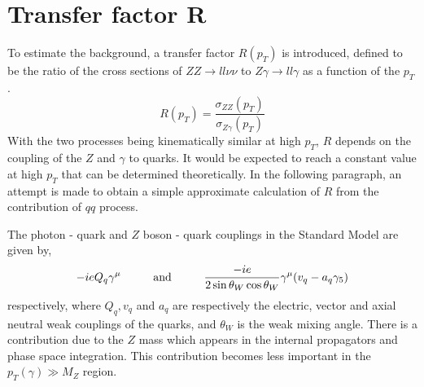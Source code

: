 \documentclass[11pt,a4paper,openright,twoside]{report}
\newcommand{\ZZ}{$ZZ\to ll\nu\nu$ }
\newcommand{\Zg}{$Z\gamma\to ll\gamma$ }
\begin{document}
\section{Transfer factor R}
To estimate the background, a transfer factor $R(p_T)$ is introduced, defined to be the ratio of the cross sections of \ZZ to \Zg as a function of the $p_T$.
\begin{equation}
	R(p_{T}) = \frac{\sigma_{ZZ}(p_{T})}{\sigma_{Z\gamma}(p_T)}
\end{equation}
With the two processes being kinematically similar at high $p_T$, $R$ depends on the coupling of the $Z$ and $\gamma$ to quarks. It would be expected to reach a constant value at high $p_T$ that can be determined theoretically. In the following paragraph, an attempt is made to obtain a simple approximate calculation of $R$ from the contribution of $qq$ process.

The photon - quark and $Z$ boson - quark couplings in the Standard Model are given by,
\begin{equation}
	-ieQ_q\gamma^{\mu} \hspace{1 cm} \text{and} \hspace{1 cm}\frac{-ie}{2 \sin\theta_W \cos\theta_W}\gamma^{\mu}(v_q - a_q\gamma_5)
\end{equation}
respectively, where $Q_q,v_q$ and $a_q$ are respectively the electric, vector and axial neutral weak couplings of the quarks, and $\theta_W$ is the weak mixing angle. There is a contribution due to the $Z$ mass which appears in the internal propagators and phase space integration. This contribution becomes less important in the $p_T(\gamma)\gg M_Z$ region.
\end{document}
